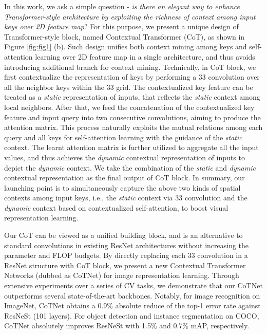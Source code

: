 \documentclass[10pt,twocolumn,letterpaper]{article}
\begin{document}
In this work, we ask a simple question - \emph{is there an elegant way to enhance Transformer-style architecture by exploiting the richness of context among input keys over 2D feature map}? For this purpose, we present a unique design of Transformer-style block, named Contextual Transformer (CoT), as shown in Figure \ref{fig:fig1} (b). Such design unifies both context mining among keys and self-attention learning over 2D feature map in a single architecture, and thus avoids introducing additional branch for context mining. Technically, in CoT block, we first contextualize the representation of keys by performing a 33 convolution over all the neighbor keys within the 33 grid. The contextualized key feature can be treated as a \emph{static} representation of inputs, that reflects the \emph{static} context among local neighbors. After that, we feed the concatenation of the contextualized key feature and input query into two consecutive  convolutions, aiming to produce the attention matrix. This process naturally exploits the mutual relations among each query and all keys for self-attention learning with the guidance of the \emph{static} context. The learnt attention matrix is further utilized to aggregate all the input values, and thus achieves the \emph{dynamic} contextual representation of inputs to depict the \emph{dynamic} context. We take the combination of the \emph{static} and \emph{dynamic} contextual representation as the final output of CoT block. In summary, our launching point is to simultaneously capture the above two kinds of spatial contexts among input keys, i.e., the \emph{static} context via 33 convolution and the \emph{dynamic} context based on contextualized self-attention, to boost visual representation learning.

Our CoT can be viewed as a unified building block, and is an alternative to standard convolutions in existing ResNet architectures without increasing the parameter and FLOP budgets.
By directly replacing each 33 convolution in a ResNet structure with CoT block, we present a new Contextual Transformer Networks (dubbed as CoTNet) for image representation learning.
Through extensive experiments over a series of CV tasks, we demonstrate that our CoTNet outperforms several state-of-the-art backbones.
Notably, for image recognition on ImageNet, CoTNet obtains a 0.9\% absolute reduce of the top-1 error rate against ResNeSt (101 layers). For object detection and instance segmentation on COCO, CoTNet absolutely improves ResNeSt with 1.5\% and 0.7\% mAP, respectively.
\end{document}
